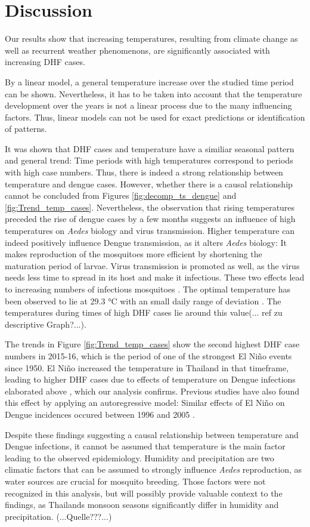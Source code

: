 \section{Discussion}
Our results show that increasing temperatures, resulting from climate change as well as recurrent weather phenomenons, are significantly associated with increasing DHF cases.

By a linear model, a general temperature increase over the studied time period can be shown. Nevertheless, it has to be taken into account that the temperature development over the years is not a linear process due to the many influencing factors. Thus, linear models can not be used for exact predictions or identification of patterns. 

It was shown that DHF cases and temperature have a similiar seasonal pattern and general trend: Time periods with high temperatures correspond to periods with high case numbers. Thus, there is indeed a strong relationship between temperature and dengue cases. However, whether there is a causal relationship cannot be concluded from Figures \ref{fig:decomp_ts_dengue} and \ref{fig:Trend_temp_cases}. Nevertheless, the observation that rising temperatures preceded the rise of dengue cases by a few months suggests an influence of high temperatures on \emph{Aedes} biology and virus transmission. 
Higher temperature can indeed positively influence Dengue transmission, as it alters \emph{Aedes} biology: It makes reproduction of the mosquitoes more efficient by shortening the maturation period of  larvae. Virus transmission is promoted as well, as the virus needs less time to spread in its host and make it infectious. These two effects lead to increasing numbers of infectious mosquitoes \citep{Anyamba2019}. The optimal temperature has been observed to lie at 29.3 °C with an small daily range of deviation \citep{Liu2014}. The temperatures during times of high DHF cases lie around this value(... ref zu descriptive Graph?...).

The trends in Figure \ref{fig:Trend_temp_cases} show the second highest DHF case numbers in 2015-16, which is the period of one of the strongest El Niño events since 1950. El Niño increased the temperature in Thailand in that timeframe, leading to higher DHF cases due to effects of temperature on Dengue infections elaborated above \citep{Anyamba2019}, which our analysis confirms. Previous studies have also found this effect by applying an autoregressive model: Similar effects of El Niño on Dengue incidences occured between 1996 and 2005 \citep{Tipayamongkholgul2009}.

Despite these findings suggesting a causal relationship between temperature and Dengue infections, it cannot be assumed that temperature is the main factor leading to the observed epidemiology. Humidity and precipitation are two climatic factors that can be assumed to strongly influence \emph{Aedes} reproduction, as water sources are crucial for mosquito breeding.  Those factors were not recognized in this analysis, but will possibly provide valuable context to the findings, as Thailands monsoon seasons significantly differ in humidity and precipitation. (...Quelle???...)





	